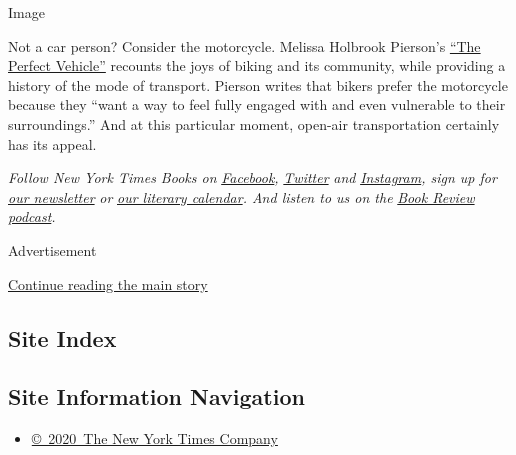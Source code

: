 Image

Not a car person? Consider the motorcycle. Melissa Holbrook Pierson's
\href{https://www.nytimes3xbfgragh.onion/1998/03/01/books/books-in-brief-nonfiction-672262.html}{``The
Perfect Vehicle''} recounts the joys of biking and its community, while
providing a history of the mode of transport. Pierson writes that bikers
prefer the motorcycle because they ``want a way to feel fully engaged
with and even vulnerable to their surroundings.'' And at this particular
moment, open-air transportation certainly has its appeal.

\emph{Follow New York Times Books on}
\href{https://www.facebookcorewwwi.onion/nytbooks/}{\emph{Facebook}}\emph{,}
\href{https://twitter.com/nytimesbooks}{\emph{Twitter}} \emph{and}
\href{https://www.instagram.com/nytbooks/}{\emph{Instagram}}\emph{, sign
up for}
\href{https://www.nytimes3xbfgragh.onion/newsletters/books-review}{\emph{our
newsletter}} \emph{or}
\href{https://www.nytimes3xbfgragh.onion/interactive/2017/books/books-calendar.html}{\emph{our
literary calendar}}\emph{. And listen to us on the}
\href{https://www.nytimes3xbfgragh.onion/column/book-review-podcast}{\emph{Book
Review podcast}}\emph{.}

Advertisement

\protect\hyperlink{after-bottom}{Continue reading the main story}

\hypertarget{site-index}{%
\subsection{Site Index}\label{site-index}}

\hypertarget{site-information-navigation}{%
\subsection{Site Information
Navigation}\label{site-information-navigation}}

\begin{itemize}
\tightlist
\item
  \href{https://help.nytimes3xbfgragh.onion/hc/en-us/articles/115014792127-Copyright-notice}{©~2020~The
  New York Times Company}
\end{itemize}

